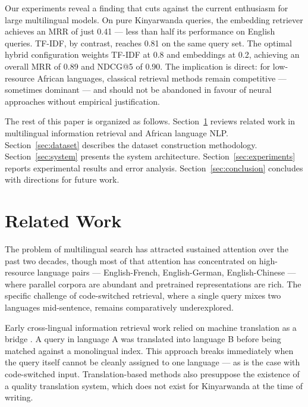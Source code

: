 \documentclass[11pt,a4paper]{article}
\begin{document}
Our experiments reveal a finding that cuts against the current enthusiasm
for large multilingual models. On pure Kinyarwanda queries, the embedding
retriever achieves an MRR of just 0.41 — less than half its performance on
English queries. TF-IDF, by contrast, reaches 0.81 on the same query set.
The optimal hybrid configuration weights TF-IDF at 0.8 and embeddings at
0.2, achieving an overall MRR of 0.89 and NDCG@5 of 0.90. The implication
is direct: for low-resource African languages, classical retrieval methods
remain competitive — sometimes dominant — and should not be abandoned in
favour of neural approaches without empirical justification.

The rest of this paper is organized as follows. Section~\ref{sec:related}
reviews related work in multilingual information retrieval and African
language NLP\@. Section~\ref{sec:dataset} describes the dataset
construction methodology. Section~\ref{sec:system} presents the system
architecture. Section~\ref{sec:experiments} reports experimental results
and error analysis. Section~\ref{sec:conclusion} concludes with directions
for future work.

\section{Related Work}
\label{sec:related}

The problem of multilingual search has attracted sustained attention over
the past two decades, though most of that attention has concentrated on
high-resource language pairs — English-French, English-German,
English-Chinese — where parallel corpora are abundant and pretrained
representations are rich. The specific challenge of code-switched
retrieval, where a single query mixes two languages mid-sentence, remains
comparatively underexplored.

Early cross-lingual information retrieval work relied on machine translation
as a bridge \citep{nie1999}. A query in language A was translated into
language B before being matched against a monolingual index. This approach
breaks immediately when the query itself cannot be cleanly assigned to one
language — as is the case with code-switched input. Translation-based
methods also presuppose the existence of a quality translation system,
which does not exist for Kinyarwanda at the time of writing.
\end{document}
